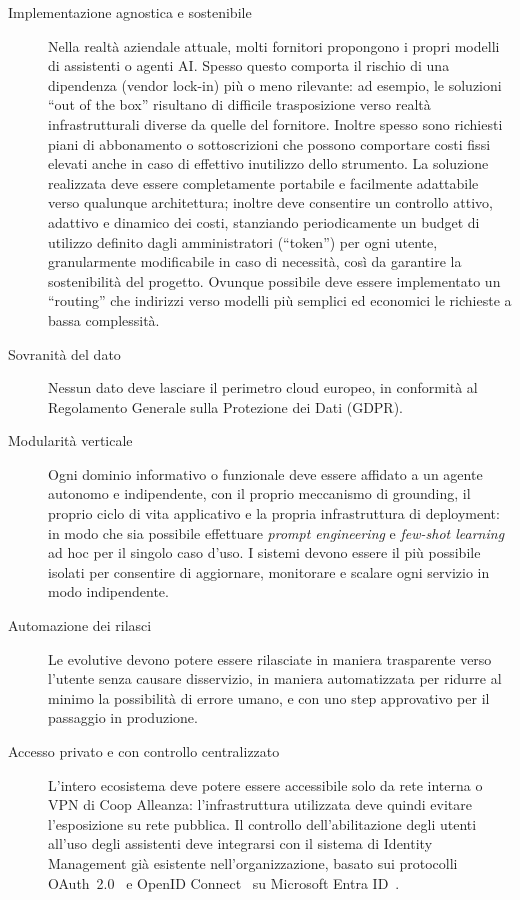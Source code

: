 \begin{description}
  \item[Implementazione agnostica e sostenibile]
    Nella realtà aziendale attuale, molti fornitori propongono i propri modelli di assistenti o agenti AI.
    Spesso questo comporta il rischio di una dipendenza (vendor lock-in) più o meno rilevante: ad esempio, le soluzioni ``out of the box'' 
    risultano di difficile trasposizione verso realtà infrastrutturali diverse da quelle del fornitore. 
    Inoltre spesso sono richiesti piani di abbonamento o sottoscrizioni che possono comportare costi fissi elevati 
    anche in caso di effettivo inutilizzo dello strumento.
    La soluzione realizzata deve essere completamente portabile e facilmente adattabile 
    verso qualunque architettura; inoltre deve consentire un controllo attivo, adattivo e dinamico dei costi, stanziando
    periodicamente un budget di utilizzo definito dagli amministratori (``token'') per ogni utente, granularmente modificabile in 
    caso di necessità, così da garantire la sostenibilità del progetto.
    Ovunque possibile deve essere implementato un ``routing'' che indirizzi verso modelli più semplici ed economici le richieste a bassa complessità.

  \item[Sovranità del dato]
    Nessun dato deve lasciare il perimetro cloud europeo, in conformità al Regolamento Generale sulla Protezione dei Dati (GDPR).

  \item[Modularità verticale]
    Ogni dominio informativo o funzionale deve essere affidato a un agente autonomo e indipendente,
    con il proprio meccanismo di grounding, il proprio ciclo di vita applicativo e la propria infrastruttura di deployment: 
    in modo che sia possibile effettuare \emph{prompt engineering} e \emph{few-shot learning}~\cite{brown2020gpt3} 
    ad hoc per il singolo caso d'uso.
    I sistemi devono essere il più possibile isolati per consentire di aggiornare, monitorare e
    scalare ogni servizio in modo indipendente.

  \item[Automazione dei rilasci]
    Le evolutive devono potere essere rilasciate in maniera trasparente verso l'utente senza causare disservizio, 
    in maniera automatizzata per ridurre al minimo la possibilità di errore umano, 
    e con uno step approvativo per il passaggio in produzione.

  \item[Accesso privato e con controllo centralizzato]
    L'intero ecosistema deve potere essere accessibile solo da rete interna o VPN di Coop Alleanza:
    l'infrastruttura utilizzata deve quindi evitare l'esposizione su rete pubblica.
    Il controllo dell'abilitazione degli utenti all'uso degli assistenti deve integrarsi con il sistema di Identity Management 
    già esistente nell'organizzazione, basato sui protocolli OAuth~2.0~\cite{rfc6749oauth2} e OpenID Connect~\cite{oidc1_0core} 
    su Microsoft Entra ID~\cite{msft_entra_id}.

\end{description}

